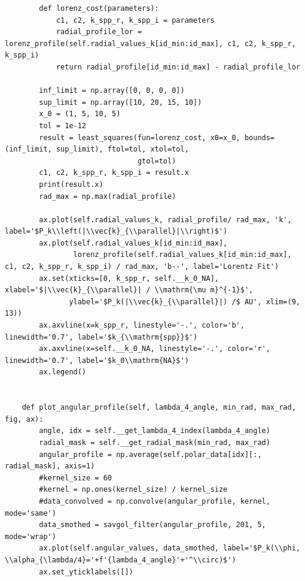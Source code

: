 \documentclass[a4paper, titlepage,  ngerman]{book}
\begin{document}
\begin{verbatim}
        def lorenz_cost(parameters):
            c1, c2, k_spp_r, k_spp_i = parameters
            radial_profile_lor = lorenz_profile(self.radial_values_k[id_min:id_max], c1, c2, k_spp_r, k_spp_i)
            return radial_profile[id_min:id_max] - radial_profile_lor

        inf_limit = np.array([0, 0, 0, 0])
        sup_limit = np.array([10, 20, 15, 10])
        x_0 = (1, 5, 10, 5)
        tol = 1e-12
        result = least_squares(fun=lorenz_cost, x0=x_0, bounds=(inf_limit, sup_limit), ftol=tol, xtol=tol,
                               gtol=tol)
        c1, c2, k_spp_r, k_spp_i = result.x
        print(result.x)
        rad_max = np.max(radial_profile)

        ax.plot(self.radial_values_k, radial_profile/ rad_max, 'k', label='$P_k\\left(|\\vec{k}_{\\parallel}|\\right)$')
        ax.plot(self.radial_values_k[id_min:id_max],
                lorenz_profile(self.radial_values_k[id_min:id_max], c1, c2, k_spp_r, k_spp_i) / rad_max, 'b--', label='Lorentz Fit')
        ax.set(xticks=[0, k_spp_r, self.__k_0_NA], xlabel='$|\\vec{k}_{\\parallel}| / \\mathrm{\mu m}^{-1}$',
               ylabel='$P_k(|\\vec{k}_{\\parallel}|) /$ AU', xlim=(9, 13))
        ax.axvline(x=k_spp_r, linestyle='-.', color='b', linewidth='0.7', label='$k_{\\mathrm{spp}}$')
        ax.axvline(x=self.__k_0_NA, linestyle='-.', color='r', linewidth='0.7', label='$k_0\\mathrm{NA}$')
        ax.legend()


    def plot_angular_profile(self, lambda_4_angle, min_rad, max_rad, fig, ax):
        angle, idx = self.__get_lambda_4_index(lambda_4_angle)
        radial_mask = self.__get_radial_mask(min_rad, max_rad)
        angular_profile = np.average(self.polar_data[idx][:, radial_mask], axis=1)
        #kernel_size = 60
        #kernel = np.ones(kernel_size) / kernel_size
        #data_convolved = np.convolve(angular_profile, kernel, mode='same')
        data_smothed = savgol_filter(angular_profile, 201, 5, mode='wrap')
        ax.plot(self.angular_values, data_smothed, label='$P_k(\\phi, \\alpha_{\lambda/4}='+f'{lambda_4_angle}'+'^\\circ)$')
        ax.set_yticklabels([])


\end{verbatim}
\end{document}
